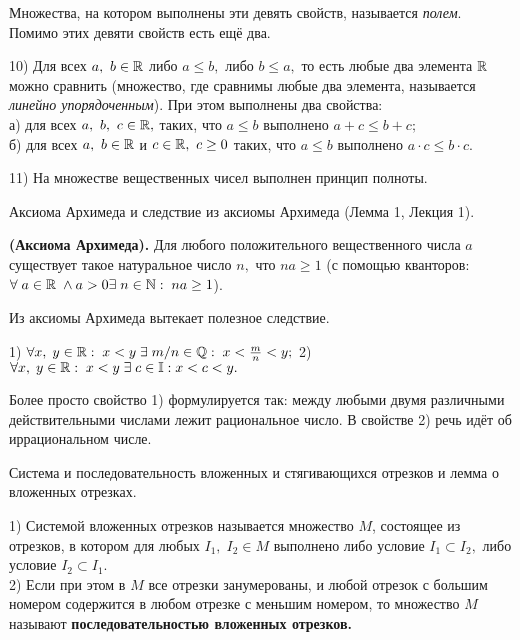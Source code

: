 Множества, на котором выполнены эти
девять свойств, называется \emph{полем}.
Помимо этих девяти свойств есть ещё два.

10) Для всех $a, \ b \in\mathbb{R}$
либо $a\leq b,$ либо $b\leq a,$
то есть любые два элемента $\mathbb{R}$
можно сравнить (множество, где сравнимы
любые два элемента, называется
\emph{линейно упорядоченным}). При
этом выполнены два свойства:\\
а) для всех $a, \ b, \ c \in\mathbb{R},$ таких,
что $a\leq b$ выполнено $a+c\leq b+c;$\\
б) для всех $a, \ b \in\mathbb{R}$ и
$c \in\mathbb{R}, \ c\geq0$ таких,
что $a\leq b$ выполнено $a\cdot c\leq b\cdot c$.

11) На множестве вещественных чисел
выполнен принцип полноты.

\newpage
\begin{problem}
Аксиома Архимеда и следствие из аксиомы Архимеда (Лемма 1, Лекция 1).
\end{problem}

\begin{axiom} \textbf{(Аксиома Архимеда).}
	Для любого положительного вещественного числа
	$a$ существует такое натуральное число $n,$ что
	$na\geq1$ (с помощью кванторов: $\forall\;a\in\mathbb{R}\;
		\wedge a>0\exists\;n\in\mathbb{N}:\;na\geq1$).
\end{axiom}
Из аксиомы Архимеда вытекает полезное
следствие.

\begin{lemma}
	1) $\forall x,\;y\in\mathbb{R}:\;x<y\;\exists\;
		m/n\in\mathbb{Q}:\;x<\frac{m}{n}<y;$
	2) $\forall x,\;y\in\mathbb{R}:\;x<y\;\exists\;
		c\in\mathbb{I}:\\x<c<y.$
\end{lemma}
Более просто свойство 1) формулируется так:
между любыми двумя различными действительными
числами лежит рациональное число. В свойстве
2) речь идёт об иррациональном числе.

\newpage
\begin{problem}
Система и последовательность вложенных и стягивающихся отрезков и лемма о вложенных отрезках.
\end{problem}


\begin{definition}
	1) Системой вложенных отрезков называется
	множество $M$, состоящее из отрезков,
	в котором для любых $I_1,\;I_2\in M$
	выполнено либо условие $I_1\subset I_2,$
	либо условие $I_2\subset I_1.$\\
	2) Если при этом в $M$
	все отрезки
	занумерованы,
	и любой отрезок с большим
	номером содержится в любом отрезке
	с меньшим номером, то множество $M$
	называют \textbf{последовательностью
		вложенных отрезков.}
\end{definition}

